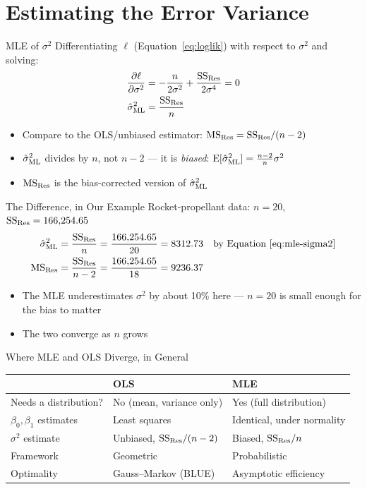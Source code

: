 \section{Estimating the Error Variance}


\begin{frame}{MLE of $\sigma^2$}
	Differentiating $\ell$ (Equation~\eqref{eq:loglik}) with respect to $\sigma^2$ and solving:
	\begin{align}
		\frac{\partial \ell}{\partial \sigma^2} &= -\frac{n}{2\sigma^2} + \frac{\mathrm{SS}_{\mathrm{Res}}}{2\sigma^4} = 0 \notag\\
		\hat\sigma^2_{\mathrm{ML}} &= \frac{\mathrm{SS}_{\mathrm{Res}}}{n} \label{eq:mle-sigma2}
	\end{align}
	\begin{itemize}
		\item Compare to the OLS/unbiased estimator: $\mathrm{MS}_{\mathrm{Res}} = \mathrm{SS}_{\mathrm{Res}}/(n-2)$
		\item $\hat\sigma^2_{\mathrm{ML}}$ divides by $n$, not $n-2$ --- it is \emph{biased}: $\operatorname{E}[\hat\sigma^2_{\mathrm{ML}}] = \frac{n-2}{n}\sigma^2$
		\item $\mathrm{MS}_{\mathrm{Res}}$ is the bias-corrected version of $\hat\sigma^2_{\mathrm{ML}}$
	\end{itemize}
\end{frame}


\begin{frame}{The Difference, in Our Example}
	Rocket-propellant data: $n=20$, $\mathrm{SS}_{\mathrm{Res}}=166{,}254.65$
	\begin{align*}
		\hat\sigma^2_{\mathrm{ML}} &= \frac{\mathrm{SS}_{\mathrm{Res}}}{n} = \frac{166{,}254.65}{20} = 8312.73 &&\text{by Equation~\eqref{eq:mle-sigma2}}\\
		\mathrm{MS}_{\mathrm{Res}} &= \frac{\mathrm{SS}_{\mathrm{Res}}}{n-2} = \frac{166{,}254.65}{18} = 9236.37
	\end{align*}
	\begin{itemize}
		\item The MLE underestimates $\sigma^2$ by about 10\% here --- $n=20$ is small enough for the bias to matter
		\item The two converge as $n$ grows
	\end{itemize}
\end{frame}


\begin{frame}{Where MLE and OLS Diverge, in General}
	\begin{center}
		\centering
		\begin{tabular}{lll}
			\toprule
			& OLS & MLE\\
			\midrule
			Needs a distribution? & No (mean, variance only) & Yes (full distribution)\\
			$\beta_0,\beta_1$ estimates & Least squares & Identical, under normality\\
			$\sigma^2$ estimate & Unbiased, $\mathrm{SS}_{\mathrm{Res}}/(n-2)$ & Biased, $\mathrm{SS}_{\mathrm{Res}}/n$\\
			Framework & Geometric & Probabilistic\\
			Optimality & Gauss--Markov (BLUE) & Asymptotic efficiency\\
			\bottomrule
		\end{tabular}
	\end{center}
\end{frame}


